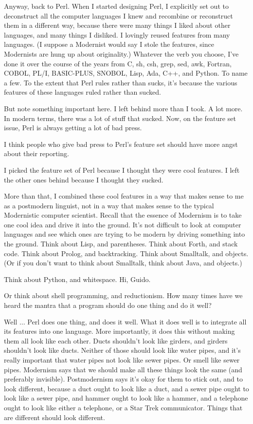 Anyway, back to Perl. When I started designing Perl, I explicitly set out to
deconstruct all the computer languages I knew and recombine or reconstruct
them in a different way, because there were many things I liked about other
languages, and many things I disliked. I lovingly reused features from many
languages. (I suppose a Modernist would say I stole the features, since
Modernists are hung up about originality.) Whatever the verb you choose, I've
done it over the course of the years from C, sh, csh, grep, sed, awk,
Fortran, COBOL, PL/I, BASIC-PLUS, SNOBOL, Lisp, Ada, C++, and Python. To name
a few. To the extent that Perl rules rather than sucks, it's because the
various features of these languages ruled rather than sucked.

But note something important here. I left behind more than I took. A lot
more. In modern terms, there was a lot of stuff that sucked. Now, on the
feature set issue, Perl is always getting a lot of bad press.

I think people who give bad press to Perl's feature set should have more
angst about their reporting.

I picked the feature set of Perl because I thought they were cool features. I
left the other ones behind because I thought they sucked.

More than that, I combined these cool features in a way that makes sense to
me as a postmodern linguist, not in a way that makes sense to the typical
Modernistic computer scientist. Recall that the essence of Modernism is to
take one cool idea and drive it into the ground. It's not difficult to look
at computer languages and see which ones are trying to be modern by driving
something into the ground. Think about Lisp, and parentheses. Think about
Forth, and stack code. Think about Prolog, and backtracking. Think about
Smalltalk, and objects. (Or if you don't want to think about Smalltalk, think
about Java, and objects.)

Think about Python, and whitespace. Hi, Guido.

Or think about shell programming, and reductionism. How many times have we
heard the mantra that a program should do one thing and do it well?

Well $\ldots$ Perl does one thing, and does it well. What it does well is to
integrate all its features into one language. More importantly, it does this
without making them all look like each other. Ducts shouldn't look like
girders, and girders shouldn't look like ducts. Neither of those should look
like water pipes, and it's really important that water pipes not look like
sewer pipes. Or smell like sewer pipes. Modernism says that we should make
all these things look the same (and preferably invisible). Postmodernism says
it's okay for them to stick out, and to look different, because a duct ought
to look like a duct, and a sewer pipe ought to look like a sewer pipe, and
hammer ought to look like a hammer, and a telephone ought to look like either
a telephone, or a Star Trek communicator. Things that are different should
look different.

